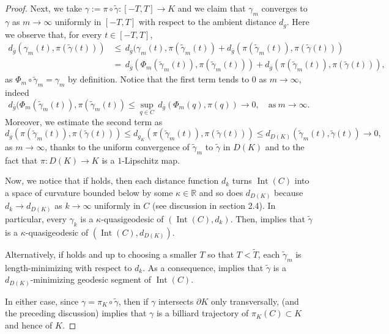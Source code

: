 \documentclass[11pt]{article}
\theoremstyle{definition}
\theoremstyle{remark}
\theoremstyle{plain}
\DeclareMathOperator{\Int}{Int}
\newcommand{\R}{\mathbb{R}}
\newcommand{\g}{\overline{g}}
\begin{document}
\begin{proof}
Next, we take $\gamma:=\pi\circ \tilde\gamma:[-T,T]\to K$ and we claim that $\gamma_m$ converges to $\gamma$ as $m\to\infty$ uniformly in $[-T,T]$ with respect to the ambient distance $d_{\g}$. Here we observe that, for every $t\in [-T,T]$,
\begin{equation}
\begin{split}
d_{\g}(\gamma_m(t), \pi(\tilde\gamma(t))) &\le\, d_{\g}(\gamma_m(t), \pi(\tilde\gamma_m(t)) + d_{\g}(\pi(\tilde\gamma_m(t)), \pi(\tilde\gamma(t))) \\ 
&= \, d_{\g}(\Phi_m(\tilde\gamma_m(t)), \pi(\tilde\gamma_m(t))) + d_{\g}(\pi(\tilde\gamma_m(t)), \pi(\tilde\gamma(t))),
\end{split}
\end{equation}
as $\Phi_m\circ \tilde\gamma_m = \gamma_m$ by definition. Notice that the first term tends to $0$ as $m\to \infty$, indeed
$$d_{\g}(\Phi_m(\tilde\gamma_m(t)), \pi(\tilde\gamma_m(t))\le \sup_{q\in C}\,d_{\g}(\Phi_m(q), \pi(q))\to 0,\quad \mbox{as}\ m\to \infty.$$
Moreover, we estimate the second term as
$$d_{\g}(\pi(\tilde\gamma_m(t)), \pi(\tilde\gamma(t)))\le d_{g_K}(\pi(\tilde\gamma_m(t)), \pi(\tilde\gamma(t)))\le d_{D(K)}(\tilde\gamma_m(t), \tilde\gamma(t))\to 0,$$
as $m\to \infty$, thanks to the uniform convergence of $\tilde \gamma_m$ to $\tilde\gamma$ in $D(K)$ and to the fact that $\pi:D(K)\to K$ is a $1$-Lipschitz map.

Now, we notice that if  holds, then each distance function $d_k$ turns $\Int(C)$ into a space of curvature bounded below by some $\kappa\in \R$ and so does $d_{D(K)}$ because $d_k\to d_{D(K)}$ as $k\to \infty$ uniformly in $C$ (see discussion in section 2.4). In particular, every $\gamma_k$ is a $\kappa$-quasigeodesic of $(\Int(C),d_k)$. Then,  implies that $\tilde\gamma$ is a $\kappa$-quasigeodesic of $(\Int(C),d_{D(K)})$.

Alternatively, if  holds and up to choosing a smaller $T$ so that $T<\tilde T$, each $\tilde\gamma_m$ is length-minimizing with respect to $d_k$. As a consequence,  implies that $\tilde\gamma$ is a $d_{D(K)}$-minimizing geodesic segment of $\Int(C)$.

In either case, since $\gamma = \pi_K\circ \tilde \gamma$, then if $\gamma$ intersects $\partial K$ only transversally,  (and the preceding discussion) implies that $\gamma$ is a billiard trajectory of $\pi_K(C)\subset K$ and hence of $K$. 

\end{proof} 
\end{document}
